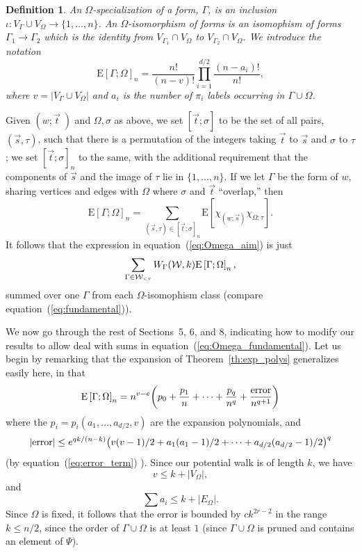 \documentclass[12pt]{article}
\newtheorem{definition}[theorem]{Definition}
\newcommand{\from}{\colon}
\newcommand{\cw}{{\cal W}}
\newcommand{\tset}{{\Psi}}
\newcommand{\intn}{{\{1,\ldots,n\}}}
\newcommand{\E}[1]{\mbox{E}\left[#1\right] }
\begin{document}
\begin{definition}
\label{de:Omega_isom}
An $\Omega$-specialization of a form, $\Gamma$,
is an inclusion $\iota\from V_\Gamma\cup V_\Omega\to\intn$.  An
$\Omega$-isomorphism of forms is an isomophism of forms $\Gamma_1\to\Gamma_2$
which is the identity from $V_{\Gamma_1}\cap  V_\Omega$ to
$V_{\Gamma_2}\cap V_\Omega$.  We introduce the notation
$$
\E{\Gamma;\Omega}_n
= \frac{n!}{(n-v)!}\prod_{i=1}^{d/2} \frac{(n-a_i)!}{n!},
$$
where $v=|V_\Gamma\cup V_\Omega|$ 
and $a_i$ is the number of $\pi_i$ labels occurring
in $\Gamma\cup\Omega$.
\end{definition}
Given $(w;\vec t\;)$ and $\Omega,\sigma$ as above, we set
$[\vec t;\sigma]$ to be the set of all pairs, 
$(\vec s,\tau)$, such that there is a permutation of
the integers taking $\vec t$ to $\vec s$ and $\sigma$ to $\tau$;
we set $[\vec t;\sigma]_n$ to the same, with the additional requirement that
the components of $\vec s$ and the image of $\tau$
lie in $\intn$.
If we let $\Gamma$ be the form of $w$, sharing vertices and edges
with $\Omega$
where $\sigma$ and $\vec t$ ``overlap,'' then
$$
\E{\Gamma;\Omega}_n = \sum_{ (\vec s,\tau)\in [\vec t;\sigma]_n}
\E{ \chi_{(w;\vec s)}
\chi_{\Omega;\tau} }.
$$
It follows that the expression in
equation~(\ref{eq:Omega_aim}) is just
\begin{equation}\label{eq:Omega_fundamental}
\sum_{\Gamma\in \cw_{<r}} W_\Gamma(\cw,k)\E{\Gamma;\Omega}_n,
\end{equation}
summed over one $\Gamma$ from each $\Omega$-isomophism class
(compare equation~(\ref{eq:fundamental})).

We now go through the rest of Sections~5, 6, and 8, indicating how to
modify our results to allow deal with sums in 
equation~(\ref{eq:Omega_fundamental}).
Let us begin by remarking that the expansion of Theorem~\ref{th:exp_polys}
generalizes easily here, in that
$$
\E{\Gamma;\Omega}_n = n^{v-e} \biggl( p_0+\frac{p_1}{n}+\cdots+\frac{p_q}{n^q}
+ \frac{{\rm error}}{n^{q+1}} \biggr)
$$
where
the $p_i=p_i(a_1,\ldots,a_{d/2},v)$ are the expansion polynomials, and
$$
|{\rm error}| \le e^{qk/(n-k)}\bigl( v(v-1)/2 + a_1(a_1-1)/2 + \cdots
+ a_{d/2}(a_{d/2}-1)/2 \bigr)^q
$$
(by equation~(\ref{eq:error_term}) ).  Since our potential walk is of
length $k$, we have
$$
v \le k + |V_\Omega|,
$$
and
$$
\sum a_i \le k + |E_\Omega|.
$$
Since $\Omega$ is fixed, it follows that the error is bounded
by $ck^{2r-2}$ in the range $k\le n/2$, 
since the order of $\Gamma\cup\Omega$ is at least $1$
(since $\Gamma\cup\Omega$ is pruned and contains an element of $\tset$).
\end{document}
